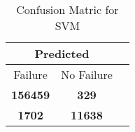 \begin{table}[] 
\caption{Confusion Matric for SVM} 
\label{Table: Prediction Accuracy-LOFSVM100.0EKF-ignoreReflection-Reflection} 
\centering 
\begin{tabular} 
 {@{}ccc@{}} 
\toprule 
\multicolumn{2}{c}{\textbf{Predicted}}
 \\ \midrule 
\multicolumn{1}{|c|}{Failure} & 
\multicolumn{1}{c|}{No Failure}
 \\ \midrule 
\multicolumn{1}{|c|}{\color{green}\textbf{156459}} & 
\multicolumn{1}{c|}{\color{red}\textbf{329}}
 \\ \midrule 
\multicolumn{1}{|c|}{\color{red}\textbf{1702}} & 
\multicolumn{1}{c|}{\color{green}\textbf{11638}}
 \\ \bottomrule 
\end{tabular} 
\end{table} 
